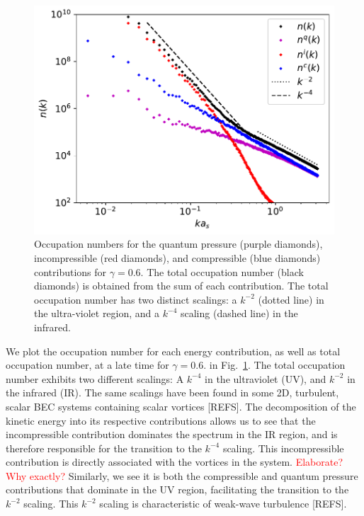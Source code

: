 \begin{figure}[t!]
    \centering
    \includegraphics[scale=0.75]{gfx/ch-twoCompDynamics/spectra.pdf}
    \caption{Occupation numbers for the quantum pressure (purple diamonds),
    incompressible (red diamonds), and compressible (blue diamonds)
    contributions for $\gamma=0.6$.
    The total occupation number (black diamonds) is obtained from the sum of
    each contribution.
    The total occupation number has two distinct scalings: a $k^{-2}$ 
    (dotted line) in the ultra-violet region, and a $k^{-4}$ scaling
    (dashed line) in the infrared.}
    \label{fig:kinetic-energy-spectra}
\end{figure}
We plot the occupation number for each energy contribution, as well as total
occupation number, at a late time for $\gamma=0.6.$ in
Fig.~\ref{fig:kinetic-energy-spectra}.
The total occupation number exhibits two different scalings: A $k^{-4}$ in the
ultraviolet (UV), and $k^{-2}$ in the infrared (IR). 
The same scalings have been found in some 2D, turbulent, scalar BEC systems
containing scalar vortices [REFS].
The decomposition of the kinetic energy into its respective contributions
allows us to see that the incompressible contribution dominates the spectrum
in the IR region, and is therefore responsible for the transition to the
$k^{-4}$ scaling.
This incompressible contribution is directly associated with the vortices in
the system. \textcolor{red}{Elaborate? Why exactly?}
Similarly, we see it is both the compressible and quantum pressure contributions
that dominate in the UV region, facilitating the transition to the $k^{-2}$
scaling.
This $k^{-2}$ scaling is characteristic of weak-wave turbulence [REFS].

